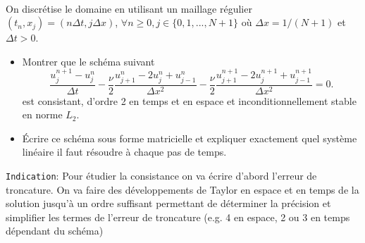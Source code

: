 \documentclass[12pt,a4paper]{article}
\begin{document}
 \\ %

\noindent On discr\'etise le domaine en utilisant un maillage r\'egulier
$(t_n,x_j)=(n\Delta t,j\Delta x)$,  $\forall n\ge 0,j\in\{0,1,...,N+1\}$ o\`u $\Delta x=1/(N+1)$ et $\Delta t>0$. \\

\begin{itemize}
\item Montrer que le sch\'ema suivant
\begin{equation}\label{sch:1}
\frac{u_j^{n+1}-u_j^n}{\Delta t}-\frac{\nu}{2} \frac{u_{j+1}^{n}-2u_j^n+u_{j-1}^{n}}{\Delta x^2}-\frac{\nu}{2} \frac{u_{j+1}^{n+1}-2u_j^{n+1}+u_{j-1}^{n+1}}{\Delta x^2}=0.
\end{equation}
est consistant, d'ordre 2 en temps et en espace et inconditionnellement stable en norme $L_2$. 

\item Écrire ce schéma sous forme matricielle et expliquer exactement quel système linéaire il faut résoudre à chaque pas de temps.

\end{itemize}

\noindent \texttt{Indication}: Pour étudier la consistance on va écrire d'abord l'erreur de troncature. On va faire des développements de Taylor en espace et en temps de la solution jusqu'à un ordre suffisant permettant de déterminer la précision et simplifier les termes de l'erreur de troncature (e.g. 4 en espace, 2 ou 3 en temps dépendant du schéma)
\end{document}

